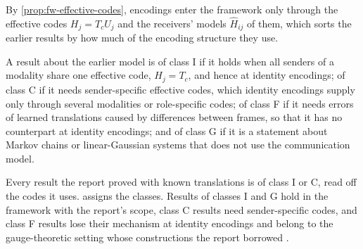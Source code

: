 By \cref{prop:fw-effective-codes}, encodings enter the framework only through the effective codes $H_j=T_cU_j$ and the receivers' models $\hat H_{ij}$ of them, which sorts the earlier results by how much of the encoding structure they use.

\begin{definition}\label{def:min-classes}
A result about the earlier model is of class I if it holds when all senders of a modality share one effective code, $H_j=T_c$, and hence at identity encodings; of class C if it needs sender-specific effective codes, which identity encodings supply only through several modalities or role-specific codes; of class F if it needs errors of learned translations caused by differences between frames, so that it has no counterpart at identity encodings; and of class G if it is a statement about Markov chains or linear-Gaussian systems that does not use the communication model.
\end{definition}

Every result the report proved with known translations is of class I or C, read off the codes it uses.  assigns the classes. Results of classes I and G hold in the framework with the report's scope, class C results need sender-specific codes, and class F results lose their mechanism at identity encodings and belong to the gauge-theoretic setting whose constructions the report borrowed \citep{dennis2026magent}.

